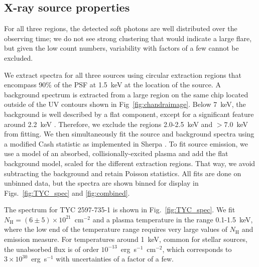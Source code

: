 \documentclass[linenumbers]{aastex631}
\begin{document}
\subsection{X-ray source properties}
\label{sec:xrayspectra}
For all three regions, the detected soft photons are well distributed over the observing time; we do not see strong clustering that would indicate a large flare, but given the low count numbers, variability with factors of a few cannot be excluded.

We extract spectra for all three sources using circular extraction regions that encompass 90\% of the PSF at 1.5~keV at the location of the source. A background spectrum is extracted from a large region on the same chip located outside of the UV contours shown in Fig~\ref{fig:chandraimage}. Below 7~keV, the background is well described by a flat component, except for a significant feature around 2.2~keV \citep[caused by fluorescence of gold in the instrument,][]{2021arXiv210811234S}. Therefore, we exclude the regions 2.0-2.5~keV and $>7.0$~keV from fitting. We then simultaneously fit the source and background spectra using a modified Cash statistic \citep{1979ApJ...228..939C} as implemented in Sherpa \citep{2007ASPC..376..543D,doug_burke_2021_4428938}. To fit source emission, we use a model of an absorbed, collisionally-excited plasma \citep[APEC model,][]{2012ApJ...756..128F} and add the flat background model, scaled for the different extraction regions. That way, we avoid subtracting the background and retain Poisson statistics. All fits are done on unbinned data, but the spectra are shown binned for display in Figs.~\ref{fig:TYC_spec} and \ref{fig:combined}.

The spectrum for TYC 2597-735-1 is shown in Fig.~\ref{fig:TYC_spec}. We fit $N_\mathrm{H}=(6\pm5)\times10^{21}$~cm$^{-2}$ and a plasma temperature in the range 0.1-1.5~keV, where the low end of the temperature range requires very large values of $N_\mathrm{H}$ and emission measure. For temperatures around 1~keV, common for stellar sources, the unabsorbed flux is of order $10^{-13}$~erg~s$^{-1}$~cm$^{-2}$, which corresponds to $3\times 10^{30}$~erg~s$^{-1}$ with uncertainties of a factor of a few.
\end{document}
